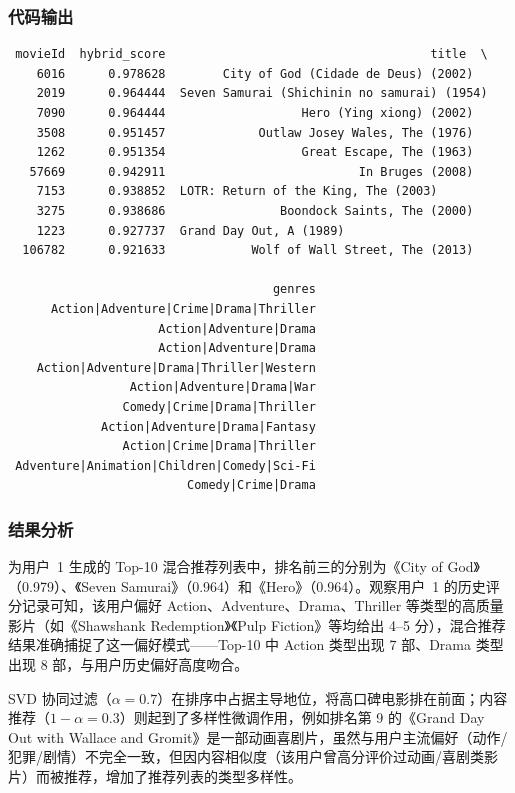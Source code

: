 \documentclass[12pt,a4paper]{ctexart}
\begin{document}
\subsubsection{代码输出}

{\scriptsize
\begin{verbatim}
 movieId  hybrid_score                                     title  \
    6016      0.978628        City of God (Cidade de Deus) (2002)
    2019      0.964444  Seven Samurai (Shichinin no samurai) (1954)
    7090      0.964444                   Hero (Ying xiong) (2002)
    3508      0.951457             Outlaw Josey Wales, The (1976)
    1262      0.951354                   Great Escape, The (1963)
   57669      0.942911                           In Bruges (2008)
    7153      0.938852  LOTR: Return of the King, The (2003)
    3275      0.938686                Boondock Saints, The (2000)
    1223      0.927737  Grand Day Out, A (1989)
  106782      0.921633            Wolf of Wall Street, The (2013)

                                     genres
      Action|Adventure|Crime|Drama|Thriller
                     Action|Adventure|Drama
                     Action|Adventure|Drama
    Action|Adventure|Drama|Thriller|Western
                 Action|Adventure|Drama|War
                Comedy|Crime|Drama|Thriller
             Action|Adventure|Drama|Fantasy
                Action|Crime|Drama|Thriller
 Adventure|Animation|Children|Comedy|Sci-Fi
                         Comedy|Crime|Drama
\end{verbatim}
}

\subsubsection{结果分析}

为用户~1 生成的 Top-10 混合推荐列表中，排名前三的分别为《City of God》（0.979）、\allowbreak《Seven Samurai》（0.964）和《Hero》（0.964）。观察用户~1 的历史评分记录可知，该用户偏好 Action、Adventure、Drama、Thriller 等类型的高质量影片（如《Shawshank Redemption》《Pulp Fiction》等均给出 4--5 分），混合推荐结果准确捕捉了这一偏好模式——Top-10 中 Action 类型出现 7 部、Drama 类型出现 8 部，与用户历史偏好高度吻合。

SVD 协同过滤（$\alpha=0.7$）在排序中占据主导地位，将高口碑电影排在前面；内容推荐（$1-\alpha=0.3$）则起到了多样性微调作用，例如排名第 9 的《Grand Day Out with Wallace and Gromit》是一部动画喜剧片，虽然与用户主流偏好（动作/犯罪/剧情）不完全一致，但因内容相似度（该用户曾高分评价过动画/喜剧类影片）而被推荐，增加了推荐列表的类型多样性。
\end{document}
